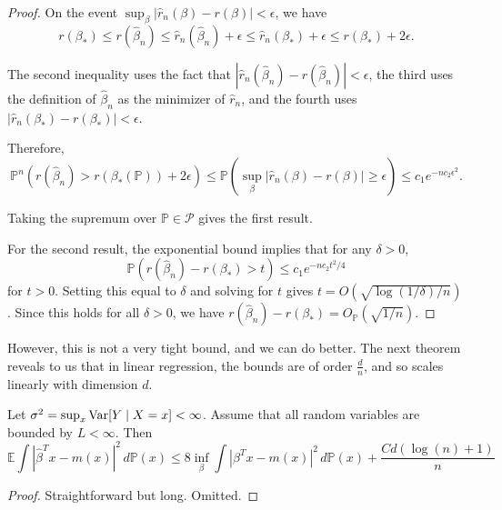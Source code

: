 \begin{proof}
    On the event $\sup_{\beta} |\hat{r}_n(\beta) - r(\beta)| < \epsilon$, we have
    \begin{equation}
     r(\beta_\ast) \leq r(\hat{\beta}_n) \leq \hat{r}_n(\hat{\beta}_n) + \epsilon \leq \hat{r}_n(\beta_\ast) + \epsilon \leq r(\beta_\ast) + 2\epsilon.
    \end{equation}

    The second inequality uses the fact that $|\hat{r}_n(\hat{\beta}_n) - r(\hat{\beta}_n)| < \epsilon$, the third uses the definition of $\hat{\beta}_n$ as the minimizer of $\hat{r}_n$, and the fourth uses $|\hat{r}_n(\beta_\ast) - r(\beta_\ast)| < \epsilon$.

    Therefore,
    \begin{equation}
     \mathbb{P}^n(r(\hat{\beta}_n) > r(\beta_\ast(\mathbb{P})) + 2\epsilon) \leq \mathbb{P}\left(\sup_{\beta} |\hat{r}_n(\beta) - r(\beta)| \geq \epsilon\right) \leq c_1 e^{-n c_2 \epsilon^2}.
    \end{equation}

    Taking the supremum over $\mathbb{P} \in \mathcal{P}$ gives the first result.

    For the second result, the exponential bound implies that for any $\delta > 0$,
    \begin{equation}
     \mathbb{P}(r(\hat{\beta}_n) - r(\beta_\ast) > t) \leq c_1 e^{-n c_2 t^2/4}
    \end{equation}
    for $t > 0$. Setting this equal to $\delta$ and solving for $t$ gives $t = O(\sqrt{\log(1/\delta)/n})$. Since this holds for all $\delta > 0$, we have $r(\hat{\beta}_n) - r(\beta_\ast) = O_{\mathbb{P}}(\sqrt{1/n})$.
  \end{proof}

  However, this is not a very tight bound, and we can do better. The next theorem reveals to us that in linear regression, the bounds are of order $\frac{d}{n}$, and so scales linearly with dimension $d$. 

  \begin{theorem} 
    Let $\sigma^2 = \sup_x \Var [Y \mid X = x] < \infty$. Assume that all random variables are bounded by $L < \infty$. Then 
    \begin{equation}
      \mathbb{E} \int |\hat{\beta}^T x - m(x) |^2 \, d\mathbb{P}(x) \leq 8 \inf_{\beta} \int |\beta^T x - m(x) |^2 \,d \mathbb{P}(x) + \frac{C d (\log(n) + 1)}{n}
    \end{equation}
  \end{theorem}
  \begin{proof}
    Straightforward but long. Omitted. 
  \end{proof}

